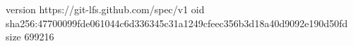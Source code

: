 version https://git-lfs.github.com/spec/v1
oid sha256:47700099fde061044c6d336345c31a1249cfeec356b3d18a40d9092e190d50fd
size 699216
